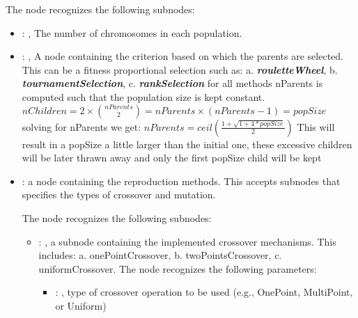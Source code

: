 \begin{itemize}
      The  node recognizes the following subnodes:
      \begin{itemize}
        \item {}: ,
          The number of chromosomes in each population.

        \item {}: ,
          A node containing the criterion based on which the parents are selected. This can be a
          fitness proportional selection such as:                   a.
          \textbf{\textit{rouletteWheel}},                   b.
          \textbf{\textit{tournamentSelection}},                   c.
          \textbf{\textit{rankSelection}}                   for all methods nParents is computed
          such that the population size is kept constant.                   $nChildren = 2 \times
          {nParents \choose 2} = nParents \times (nParents-1) = popSize$                   solving
          for nParents we get:                   $nParents = ceil(\frac{1 + \sqrt{1+4*popSize}}{2})$
          This will result in a popSize a little larger than the initial one, these excessive
          children will be later thrawn away and only the first popSize child will be kept

        \item {}:
          a node containing the reproduction methods.                   This accepts subnodes that
          specifies the types of crossover and mutation.

          The  node recognizes the following subnodes:
          \begin{itemize}
            \item {}: ,
              a subnode containing the implemented crossover mechanisms.                   This
              includes: a.    onePointCrossover,                                  b.
              twoPointsCrossover,                                  c.    uniformCrossover.
              The  node recognizes the following parameters:
                \begin{itemize}
                  \item {}: ,
                    type of crossover operation to be used (e.g., OnePoint, MultiPoint, or Uniform)
              \end{itemize}


\end{itemize}
\end{itemize}
\end{itemize}
